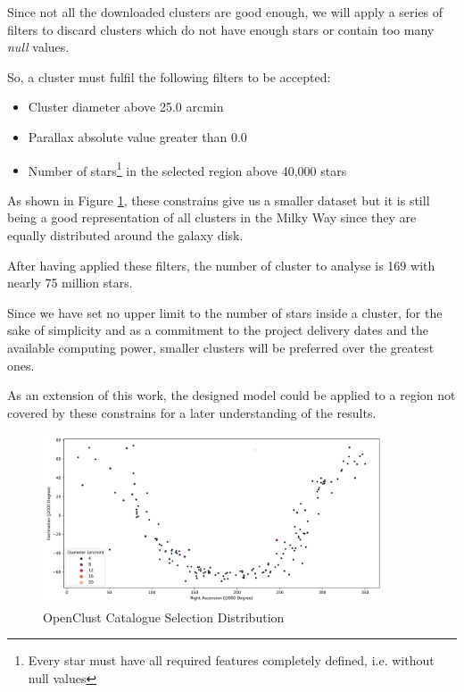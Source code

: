 \documentclass[11pt, a4paper, english]{book}
\begin{document}
Since not all the downloaded clusters are good enough, we will apply a series of filters to discard clusters which do not have enough stars or contain too
many \emph{null} values.

So, a cluster must fulfil the following filters to be accepted:

\begin{itemize}
  \item Cluster diameter above 25.0 arcmin
  \item Parallax absolute value greater than 0.0
  \item Number of stars\footnote{Every star must have all required features completely defined, i.e. without null values} in the selected region above 40,000 stars
\end{itemize}

As shown in Figure \ref{fig:OpenClustSelection}, these constrains give us a smaller dataset but it is still being a good representation of all clusters in the Milky Way
since they are equally distributed around the galaxy disk.

After having applied these filters, the number of cluster to analyse is 169 with nearly 75 million stars.

Since we have set no upper limit to the number of stars inside a cluster, for the sake of simplicity and as a commitment to the project delivery dates
and the available computing power, smaller clusters will be preferred over the greatest ones.

As an extension of this work, the designed model could be applied to a region not covered by these constrains for a later understanding of the results.

\begin{figure}[htbp]
  \centering
  \includegraphics[width=0.9\textwidth]{../figures/cluster_selection_tier1.png}
  \caption{OpenClust Catalogue Selection Distribution}
  \label{fig:OpenClustSelection}
\end{figure}
\end{document}
